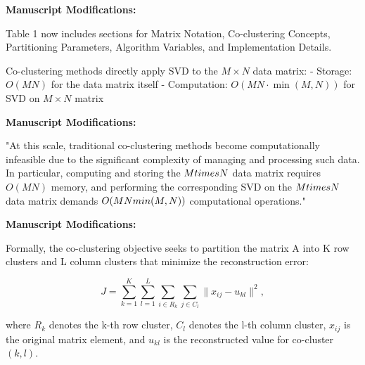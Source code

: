 \documentclass{ar2rc}
\begin{document}
\textbf{Manuscript Modifications:}

Table 1 now includes sections for Matrix Notation, Co-clustering Concepts, Partitioning Parameters, Algorithm Variables, and Implementation Details.



Co-clustering methods directly apply SVD to the $M \times N$ data matrix:
- Storage: $O(MN)$ for the data matrix itself
- Computation: $O(MN \cdot \min(M,N))$ for SVD on $M \times N$ matrix

\textbf{Manuscript Modifications:}

"At this scale, traditional co-clustering methods become computationally infeasible due to the significant complexity of managing and processing such data. In particular, computing and storing the $M \\times N$ data matrix requires $O(MN)$ memory, and performing the corresponding SVD on the $M \\times N$ data matrix demands $O(MN\\min(M,N))$ computational operations."



\textbf{Manuscript Modifications:}

Formally, the co-clustering objective seeks to partition the matrix A into K row clusters and L column clusters that minimize the reconstruction error:

\begin{equation}
  J = \sum_{k=1}^{K} \sum_{l=1}^{L} \sum_{i \in R_k} \sum_{j \in C_l} \| x_{ij} - u_{kl} \|^2,
\end{equation}

where $R_k$ denotes the k-th row cluster, $C_l$ denotes the l-th column cluster, $x_{ij}$ is the original matrix element, and $u_{kl}$ is the reconstructed value for co-cluster $(k,l)$.
\end{document}
